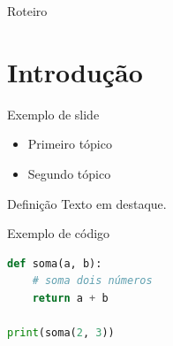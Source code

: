 {
\begin{frame}[plain]
  \titlepage
\end{frame}
}

\begin{frame}{Roteiro}
  \tableofcontents
\end{frame}

\section{Introdução}
\begin{frame}{Exemplo de slide}
  \begin{itemize}
    \item Primeiro tópico
    \item Segundo tópico
  \end{itemize}

  \begin{block}{Definição}
    Texto em destaque.
  \end{block}
\end{frame}

\begin{frame}[fragile]{Exemplo de código}
\begin{lstlisting}[language=Python]
def soma(a, b):
    # soma dois números
    return a + b

print(soma(2, 3))
\end{lstlisting}
\end{frame}


